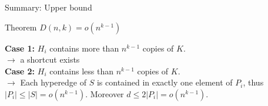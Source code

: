 

\begin{frame}{Summary: Upper bound}
    \begin{theorem}{Theorem}
        \(D(n,k) =o(n^{k-1})\)
    \end{theorem}
    \textcolor{cfred}{\textbf{Case 1:}} \(H_i\) contains more than \(n^{k-1}\) copies of \(K\).\\
    \(\longrightarrow\) a shortcut exists\\
    \textcolor{cfred}{\textbf{Case 2:}} \(H_i\) contains less than \(n^{k-1}\) copies of \(K\).\\
     \(\longrightarrow\)    Each hyperedge of \(S\) is contained in exactly one element of \(P_i\), thus \(|P_i|\leq |S| = o(n^{k-1})\). Moreover \(d\leq 2 | P_i|=o(n^{k-1})\).
\end{frame}